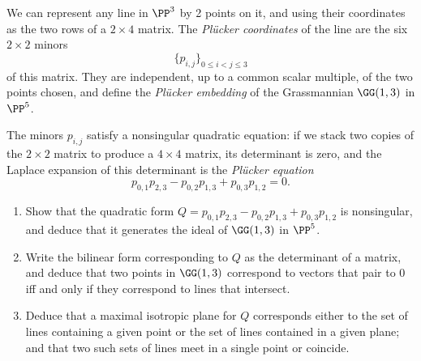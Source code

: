  
 
\begin{exercise}\label{G13}
We can represent any line in $\PP^3$ by 2 points on it, and using their coordinates as the two rows of a 
$2\times 4$ matrix. The \emph{Pl\"ucker coordinates} of the line are the six $2\times 2$ minors
$$
\{p_{i,j}\}_{0\leq i<j\leq 3}
$$
of this matrix. They are independent, up to a common scalar multiple, of the two points chosen, and define the \emph{Pl\"ucker embedding} of the Grassmannian $\GG(1,3)$ in $\PP^5$.

The minors $p_{i,j}$  satisfy a nonsingular quadratic equation: if we stack two copies of the $2\times 2$
matrix to produce a $4\times 4$ matrix, its determinant is zero, and the Laplace expansion of this determinant
is the \emph{Pl\"ucker equation}
$$
p_{0,1}p_{2,3}-p_{0,2}p_{1,3}+p_{0,3}p_{1,2} = 0.
$$

\begin{enumerate}
\item Show that the quadratic form
$
Q = p_{0,1}p_{2,3}-p_{0,2}p_{1,3}+p_{0,3}p_{1,2}
$
is nonsingular, and deduce that it generates the ideal of $\GG(1,3)$ in $\PP^5$.
\item
Write the bilinear form corresponding to $Q$ as the determinant of a matrix, and deduce that 
two points in $\GG(1,3)$ correspond to vectors that pair to 0 iff and only if they correspond to lines that intersect.
\item Deduce that a maximal isotropic plane for $Q$ corresponds either to the set of lines containing a given point or the set of lines contained in a given plane; and that two such sets of lines meet in a single point or coincide.
\end{enumerate}
\end{exercise}





